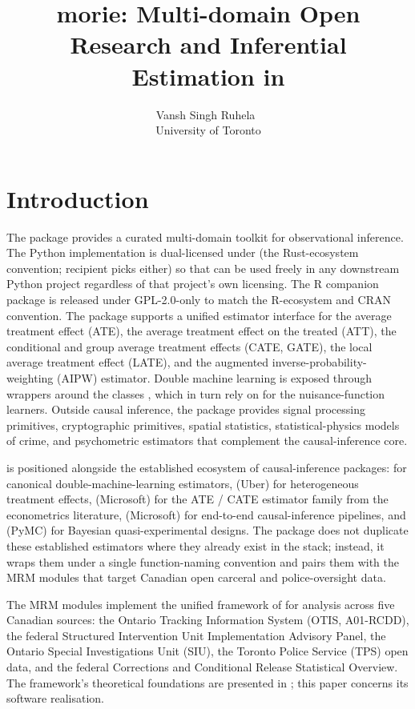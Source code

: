 \documentclass[article,shortnames,nojss]{jss}
\title{morie: Multi-domain Open Research and Inferential Estimation in \proglang{Python}}
\author{Vansh Singh Ruhela~\orcidlink{0009-0004-1750-3592}\\University of Toronto}
\newcommand{\OTIS}{\textsf{OTIS}}
\newcommand{\SIU}{\textsf{SIU}}
\newcommand{\TPS}{\textsf{TPS}}
\begin{document}
\sloppy

\section{Introduction}
\label{sec:intro}

The  package  provides a curated
multi-domain toolkit for observational inference. The Python
implementation is dual-licensed under 
(the Rust-ecosystem convention; recipient picks either) so that
 can be used freely in any downstream Python project
regardless of that project's own licensing.  The R companion
package \citep{Ruhela2026MorieR} is released under
GPL-2.0-only to match the R-ecosystem and CRAN convention.  The
package supports a
unified estimator interface for the average treatment effect
(ATE), the average treatment effect on the treated (ATT), the
conditional and group average treatment effects (CATE, GATE), the
local average treatment effect (LATE), and the augmented
inverse-probability-weighting (AIPW) estimator. Double machine
learning is exposed through wrappers around the 
classes \citep{Bach2022DoubleMLpy, Bach2024DoubleML}, which in
turn rely on  \citep{Pedregosa2011} for the
nuisance-function learners. Outside causal inference, the package
provides signal processing primitives, cryptographic primitives,
spatial statistics, statistical-physics models of crime, and
psychometric estimators that complement the causal-inference core.

 is positioned alongside the established
 ecosystem of causal-inference packages:
 \citep{Bach2022DoubleMLpy} for canonical
double-machine-learning estimators,  (Uber) for
heterogeneous treatment effects,  (Microsoft) for the
ATE / CATE estimator family from the econometrics literature,
 (Microsoft) for end-to-end causal-inference
pipelines, and  (PyMC) for Bayesian
quasi-experimental designs. The package does not duplicate these
established estimators where they already exist in the
 stack; instead, it wraps them under a single
function-naming convention and pairs them with the MRM modules
that target Canadian open carceral and police-oversight data.

The MRM modules implement the unified framework of
\citet{Ruhela2026MRM} for analysis across five Canadian sources:
the Ontario Tracking Information System (\OTIS, A01-RCDD), the
federal Structured Intervention Unit Implementation Advisory
Panel, the Ontario Special Investigations Unit (\SIU), the
Toronto Police Service (\TPS) open data, and the federal
Corrections and Conditional Release Statistical Overview. The
framework's theoretical foundations are presented in
\citet{Ruhela2026MRM}; this paper concerns its 
software realisation.
\end{document}
